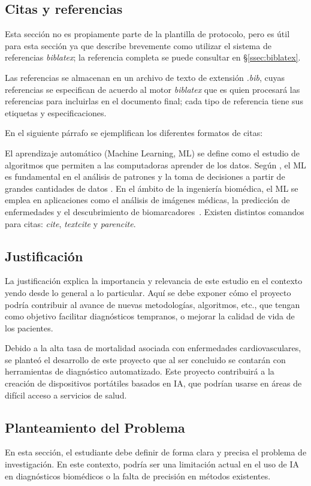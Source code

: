 \documentclass[12pt,letterpaper,spanish, twoside]{article}
\begin{document}
\subsection*{Citas y referencias}
Esta sección no es propiamente parte de la plantilla de protocolo, pero es útil para esta sección ya que describe brevemente como utilizar el sistema de referencias \textit{biblatex}; la referencia completa se puede consultar en \S\ref{ssec:biblatex}.

Las referencias se almacenan en un archivo de texto de extensión \textit{.bib}, cuyas referencias se especifican de acuerdo al motor \textit{biblatex} que es quien procesará las referencias para incluirlas en el documento final; cada tipo de referencia tiene sus etiquetas y especificaciones.

\ej En el siguiente párrafo se ejemplifican los diferentes formatos de citas:

El aprendizaje automático (Machine Learning, ML) se define como el estudio de algoritmos que permiten a las computadoras aprender de los datos. Según \textcite{Bishop2006}, el ML es fundamental en el análisis de patrones y la toma de decisiones a partir de grandes cantidades de datos \parencite{Bishop2006}. En el ámbito de la ingeniería biomédica, el ML se emplea en aplicaciones como el análisis de imágenes médicas, la predicción de enfermedades y el descubrimiento de biomarcadores~\parencite{Park2018, Shaikhina2015, Krishnan2021}. Existen distintos comandos para citas: \textit{cite}, \textit{textcite} y \textit{parencite}.

\subsection{Justificación}
La justificación explica la importancia y relevancia de este estudio en el contexto yendo desde lo general a lo particular. Aquí se debe exponer cómo el proyecto podría contribuir al avance de nuevas metodologías, algoritmos, etc., que tengan como objetivo facilitar diagnósticos tempranos, o mejorar la calidad de vida de los pacientes.

\ej Debido a la alta tasa de mortalidad asociada con enfermedades cardiovasculares, se planteó el desarrollo de este proyecto que al ser concluido se contarán con herramientas de diagnóstico automatizado. Este proyecto contribuirá a la creación de dispositivos portátiles basados en IA, que podrían usarse en áreas de difícil acceso a servicios de salud.

\subsection{Planteamiento del Problema}
En esta sección, el estudiante debe definir de forma clara y precisa el problema de investigación. En este contexto, podría ser una limitación actual en el uso de IA en diagnósticos biomédicos o la falta de precisión en métodos existentes.
\end{document}
